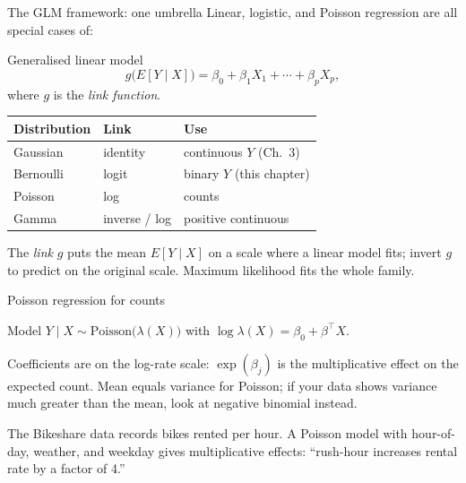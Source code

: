 \documentclass[aspectratio=169,11pt]{beamer}
\begin{document}
\begin{frame}{The GLM framework: one umbrella}
  Linear, logistic, and Poisson regression are all special cases of:
  \begin{block}{Generalised linear model}
    \[
      g\bigl(E[Y \mid X]\bigr) = \beta_0 + \beta_1 X_1 + \cdots + \beta_p X_p,
    \]
    where $g$ is the \emph{link function}.
  \end{block}
  \vspace{-2mm}
  \begin{center}\small
  \begin{tabular}{lll}
    \toprule
    Distribution & Link & Use \\
    \midrule
    Gaussian   & identity   & continuous $Y$ (Ch.~3) \\
    Bernoulli  & logit      & binary $Y$ (this chapter) \\
    Poisson    & log        & counts \\
    Gamma      & inverse / log & positive continuous \\
    \bottomrule
  \end{tabular}
  \end{center}
  \vspace{-2mm}
  \begin{readme}
    The \emph{link} $g$ puts the mean $E[Y\mid X]$ on a scale where a
    linear model fits; invert $g$ to predict on the original scale.
    Maximum likelihood fits the whole family.
  \end{readme}
\end{frame}

\begin{frame}{Poisson regression for counts}
  \begin{block}{Model}
    $Y \mid X \sim \mathrm{Poisson}\bigl(\lambda(X)\bigr)$ with
    $\log \lambda(X) = \beta_0 + \beta^\top X$.
  \end{block}
  \begin{readme}
    Coefficients are on the log-rate scale: $\exp(\beta_j)$ is the
    multiplicative effect on the expected count. Mean equals variance
    for Poisson; if your data shows variance much greater than the
    mean, look at negative binomial instead.
  \end{readme}
  \begin{numexample}[Bikeshare]
    The Bikeshare data records bikes rented per hour. A Poisson model
    with hour-of-day, weather, and weekday gives multiplicative
    effects: ``rush-hour increases rental rate by a factor of 4.''
  \end{numexample}
\end{frame}
\end{document}
